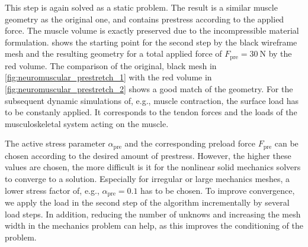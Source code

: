 This step is again solved as a static problem. The result is a similar muscle geometry as the original one, and contains prestress according to the applied force. The muscle volume is exactly preserved due to the incompressible material formulation.  shows the starting point for the second step by the black wireframe mesh and the resulting geometry for a total applied force of $F_\text{pre}=\SI{30}{\newton}$ by the red volume. The comparison of the original, black mesh in \cref{fig:neuromuscular_prestretch_1} with the red volume in \cref{fig:neuromuscular_prestretch_2} shows a good match of the geometry.
For the subsequent dynamic simulations of, e.g., muscle contraction, the surface load has to be constanly applied. It corresponds to the tendon forces and the loads of the musculoskeletal system acting on the muscle.

The active stress parameter $\alpha_\text{pre}$ and the corresponding preload force $F_\text{pre}$ can be chosen according to the desired amount of prestress. However, the higher these values are chosen, the more difficult is it for the nonlinear solid mechanics solvers to converge to a solution. Especially for irregular or large mechanics meshes, a lower stress factor of, e.g., $\alpha_\text{pre}=0.1$ has to be chosen. To improve convergence, we apply the load in the second step of the algorithm incrementally by several load steps. In addition, reducing the number of unknows and increasing the mesh width in the mechanics problem can help, as this improves the conditioning of the problem. 
 
